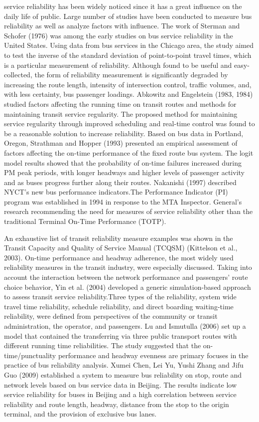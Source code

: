 \documentclass[12pt,journal,compsoc]{IEEEtran}
\begin{document}
 service reliability has been widely noticed since it has a great influence on the daily life of public. Large number of studies have been conducted to measure bus reliability as well as analyze factors with influence.
The work of Sterman and Schofer (1976) was among the early studies on bus service reliability in the United States. Using data from bus services in the Chicago area, the study aimed to test the inverse of the standard deviation of point-to-point travel times, which is a particular measurement of reliability. Although found to be useful and easy-collected, the form of reliability measurement is significantly degraded by increasing the route length, intensity of intersection control, traffic volumes, and, with less certainty, bus passenger loadings.
Abkowitz and Engelstein (1983, 1984) studied factors affecting the running time on transit routes and methods for maintaining transit service regularity. The proposed method for maintaining service regularity through improved scheduling and real-time control was found to be a reasonable solution to increase reliability.
Based on bus data in Portland, Oregon, Strathman and Hopper (1993) presented an empirical assessment of factors affecting the on-time performance of the fixed route bus system. The logit model results showed that the probability of on-time failures increased during PM peak periods, with longer headways and higher levels of passenger activity and as buses progress further along their routes.
Nakanishi (1997) described NYCT’s new bus performance indicators.The Performance Indicator (PI) program was established in 1994 in response to the MTA Inspector. General’s research recommending the need for measures of service reliability other than the traditional Terminal On-Time Performance (TOTP). 

An exhaustive list of transit reliability measure examples was shown in the Transit Capacity and Quality of Service Manual (TCQSM) (Kittelson et al., 2003). On-time performance and headway adherence, the most widely used reliability measures in the transit industry, were especially discussed.
Taking into account the interaction between the network performance and passengers’ route choice behavior, Yin et al. (2004) developed a generic simulation-based approach to assess transit service reliability.Three types of the reliability, system wide travel time reliability, schedule reliability, and direct boarding waiting-time reliability, were defined from perspectives of the community or transit administration, the operator, and passengers.
Lu and Ismutulla (2006) set up a model that contained the transferring via three public transport routes with different running time reliabilities. The study suggested that the on-time/punctuality performance and headway evenness are primary focuses in the practice of bus reliability analysis.
Xumei Chen, Lei Yu, Yushi Zhang and Jifu Guo (2009) established a system to measure bus reliability on stop, route and network levels based on bus service data in Beijing. The results indicate low service reliability for buses in Beijing and a high correlation between service reliability and route length, headway, distance from the stop to the origin terminal, and the provision of exclusive bus lanes.
\end{document}
